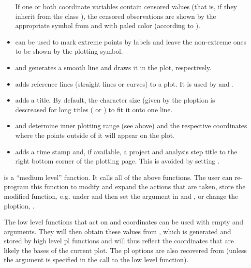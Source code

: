 \documentclass[11pt]{article}\usepackage[]{graphicx}\usepackage[]{color}
\begin{document}
\begin{itemize}
  If one or both coordinate variables contain censored values (that is,
  if they inherit from the class ), the censored observations are
  shown by the appropriate symbol from \Hneed{80mm}
   and 
  with paled color (according to ).
\item
   can be used to mark extreme points by labels and leave the
  non-extreme ones to be shown by the plotting symbol.
\item
   and  generates a smooth line and draws it 
  in the plot, respectively.
\item
   adds reference lines (straight lines or curves) to a plot.
  It is used by  and .
\item
   adds a title. By default, the character size 
  (given by the ploption  is descreased
  for long titles ( or ) to fit it onto one line.
\item
   and  determine inner plotting range 
  (see above) and the respective coordinates where the points outside of it
  will appear on the plot.
\item
   adds a time stamp and, if available, a project and analysis
  step title to the right bottom corner of the plotting page.
  This is avoided by setting .
\end{itemize}

 is a ``medium level'' function. It calls all of the above
functions.
The user can re-program this function to modify and expand the actions that
are taken, store the modified function, e.g. under 
and then set %
the argument  in  and ,
or change the ploption, .

The low level functions that act on  and  coordinates can be used
with empty  and  arguments. They will then obtain these values
from , which is generated and stored by high level 
pl functions and will thus reflect the coordinates that are likely the
bases of the current plot. 
The pl options are also recovered from  (unless the argument
 is specified in the call to the low level function).
\end{document}

